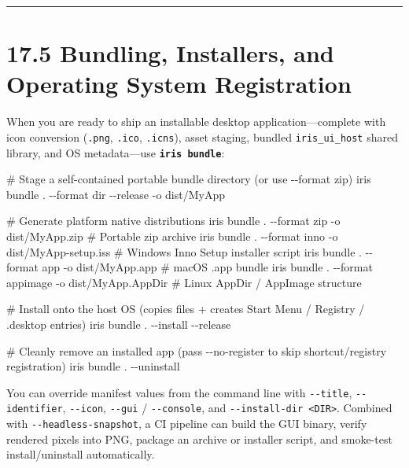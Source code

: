 \documentclass[
  english,
  oneside]{book}
\newenvironment{Shaded}{\begin{snugshade}}{\end{snugshade}}
\newcommand{\NormalTok}[1]{\textcolor[rgb]{0.83,0.83,0.83}{#1}}
\begin{document}
\begin{center}\rule{0.5\linewidth}{0.5pt}\end{center}

\section{17.5 Bundling, Installers, and Operating System
Registration}\label{bundling-installers-and-operating-system-registration}

When you are ready to ship an installable desktop application---complete
with icon conversion (\texttt{.png}, \texttt{.ico}, \texttt{.icns}),
asset staging, bundled \texttt{iris\_ui\_host} shared library, and OS
metadata---use \textbf{\texttt{iris\ bundle}}:

\begin{Shaded}
\begin{Highlighting}[]
\NormalTok{\# Stage a self{-}contained portable bundle directory (or use {-}{-}format zip)}
\NormalTok{iris bundle . {-}{-}format dir {-}{-}release {-}o dist/MyApp}

\NormalTok{\# Generate platform native distributions}
\NormalTok{iris bundle . {-}{-}format zip {-}o dist/MyApp.zip         \# Portable zip archive}
\NormalTok{iris bundle . {-}{-}format inno {-}o dist/MyApp{-}setup.iss  \# Windows Inno Setup installer script}
\NormalTok{iris bundle . {-}{-}format app {-}o dist/MyApp.app         \# macOS .app bundle}
\NormalTok{iris bundle . {-}{-}format appimage {-}o dist/MyApp.AppDir \# Linux AppDir / AppImage structure}

\NormalTok{\# Install onto the host OS (copies files + creates Start Menu / Registry / .desktop entries)}
\NormalTok{iris bundle . {-}{-}install {-}{-}release}

\NormalTok{\# Cleanly remove an installed app (pass {-}{-}no{-}register to skip shortcut/registry registration)}
\NormalTok{iris bundle . {-}{-}uninstall}
\end{Highlighting}
\end{Shaded}

You can override manifest values from the command line with
\texttt{-\/-title}, \texttt{-\/-identifier}, \texttt{-\/-icon},
\texttt{-\/-gui} / \texttt{-\/-console}, and
\texttt{-\/-install-dir\ \textless{}DIR\textgreater{}}. Combined with
\texttt{-\/-headless-snapshot}, a CI pipeline can build the GUI binary,
verify rendered pixels into PNG, package an archive or installer script,
and smoke-test install/uninstall automatically.
\end{document}
